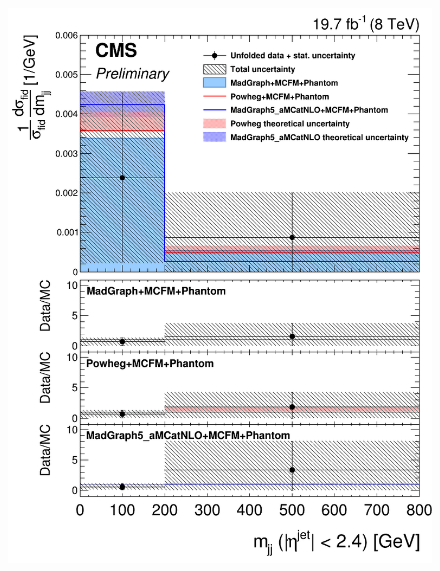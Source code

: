 \begin{figure}[hbtp]
\begin{center}
    \includegraphics[width=\cmsFigWidth]{Figures/DiffCrossSecZZTo4eCentralMjj_Unfolded_fr_MadGraph_norm.png}     

\end{center}
\end{figure}
